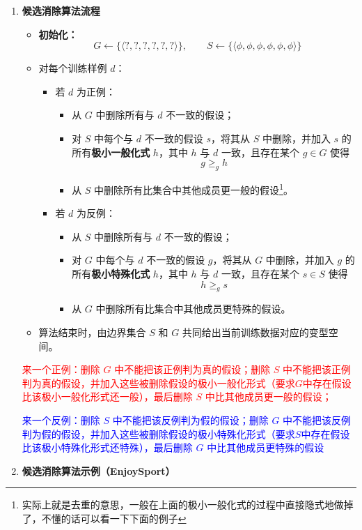 \documentclass[../main.tex]{subfiles}
\begin{document}
\begin{enumerate}
    \item \textbf{候选消除算法流程}
    \begin{itemize}
        \item \textbf{初始化：}
        \[
            G \leftarrow \{\langle ?, ?, ?, ?, ?, ? \rangle\},\qquad
            S \leftarrow \{\langle \phi,\phi,\phi,\phi,\phi,\phi \rangle\}
        \]
        \item 对每个训练样例 $d$：
        \begin{itemize}
            \item 若 $d$ 为正例：
            \begin{itemize}
                \item 从 $G$ 中删除所有与 $d$ 不一致的假设；
                \item 对 $S$ 中每个与 $d$ 不一致的假设 $s$，将其从 $S$ 中删除，并加入 $s$ 的所有\textbf{极小一般化式} $h$，其中 $h$ 与 $d$ 一致，且存在某个 $g\in G$ 使得
                \[
                    g \geq_g h
                \]
                \item 从 $S$ 中删除所有比集合中其他成员更一般的假设\footnote{实际上就是去重的意思，一般在上面的极小一般化式的过程中直接隐式地做掉了，不懂的话可以看一下下面的例子}。
            \end{itemize}
            \item 若 $d$ 为反例：
            \begin{itemize}
                \item 从 $S$ 中删除所有与 $d$ 不一致的假设；
                \item 对 $G$ 中每个与 $d$ 不一致的假设 $g$，将其从 $G$ 中删除，并加入 $g$ 的所有\textbf{极小特殊化式} $h$，其中 $h$ 与 $d$ 一致，且存在某个 $s\in S$ 使得
                \[
                    h \geq_g s
                \]
                \item 从 $G$ 中删除所有比集合中其他成员更特殊的假设。
            \end{itemize}
        \end{itemize}
        \item 算法结束时，由边界集合 $S$ 和 $G$ 共同给出当前训练数据对应的变型空间。
    \end{itemize}
\textcolor{red}{来一个正例：删除 $G$ 中不能把该正例判为真的假设；删除 $S$ 中不能把该正例判为真的假设，并加入这些被删除假设的极小一般化形式（要求$G$中存在假设比该极小一般化形式还一般），最后删除 $S$ 中比其他成员更一般的假设；}

\textcolor{blue}{来一个反例：删除 $S$ 中不能把该反例判为假的假设；删除 $G$ 中不能把该反例判为假的假设，并加入这些被删除假设的极小特殊化形式（要求$S$中存在假设比该极小特殊化形式还特殊），最后删除 $G$ 中比其他成员更特殊的假设\\}
    \item \textbf{候选消除算法示例（EnjoySport）}


\end{enumerate}
\end{document}
